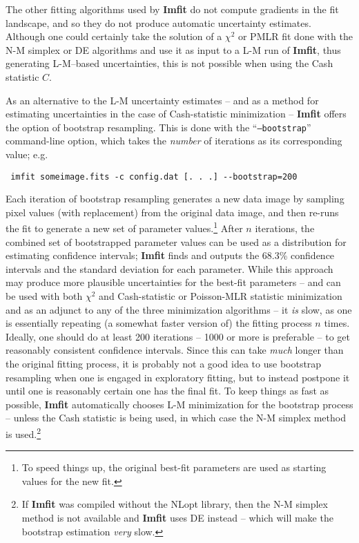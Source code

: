 \documentclass[10pt,a4paper,article]{memoir}
\newcommand{\imfit}{\textbf{Imfit}}
\newcommand{\chisquare}{\ensuremath{\chi^{2}}}
\newcommand{\pmlr}{PMLR}
\begin{document}
The other fitting algorithms used by \imfit{} do not compute gradients
in the fit landscape, and so they do not produce automatic uncertainty
estimates. Although one could certainly take the solution of a
\chisquare{} or \pmlr{} fit done with the N-M simplex or DE
algorithms and use it as input to a L-M run of \imfit, thus generating
L-M--based uncertainties, this is not possible when using the Cash statistic $C$.

As an alternative to the L-M uncertainty estimates -- and as a method
for estimating uncertainties in the case of Cash-statistic minimization
-- \imfit{} offers the option of bootstrap resampling. This is done with
the ``\texttt{--bootstrap}'' command-line option, which takes the
\textit{number} of iterations as its corresponding value; e.g.
\begin{verbatim} imfit someimage.fits -c config.dat [. . .] --bootstrap=200 \end{verbatim}

Each iteration of bootstrap resampling generates a new data image by
sampling pixel values (with replacement) from the original data image,
and then re-runs the fit to generate a new set of parameter
values.\footnote{To speed things up, the original best-fit parameters
are used as starting values for the new fit.} After $n$ iterations, the
combined set of bootstrapped parameter values can be used as a
distribution for estimating confidence intervals; \imfit{} finds and
outputs the 68.3\% confidence intervals and the standard deviation for
each parameter. While this approach may produce more plausible
uncertainties for the best-fit parameters -- and can be used with both
\chisquare{} and Cash-statistic or Poisson-MLR statistic minimization
and as an adjunct to any of the three minimization algorithms -- it
\textit{is} slow, as one is essentially repeating (a somewhat faster
version of) the fitting process $n$ times. Ideally, one should do at
least 200 iterations -- 1000 or more is preferable -- to get reasonably
consistent confidence intervals. Since this can take \textit{much}
longer than the original fitting process, it is probably not a good idea
to use bootstrap resampling when one is engaged in exploratory fitting,
but to instead postpone it until one is reasonably certain one has the
final fit. To keep things as fast as possible, \imfit{} automatically
chooses L-M minimization for the bootstrap process -- unless the
Cash statistic is being used, in which case the N-M simplex
method is used.\footnote{If \imfit{} was compiled without the NLopt
library, then the N-M simplex method is not available and \imfit{} uses
DE instead -- which will make the bootstrap estimation \textit{very}
slow.}
\end{document}

